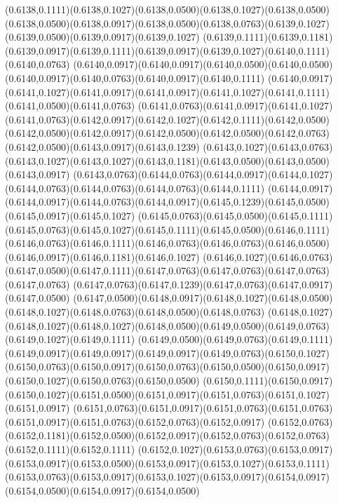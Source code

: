 (0.6138,0.1111)(0.6138,0.1027)(0.6138,0.0500)(0.6138,0.1027)(0.6138,0.0500)
\PST@Solid(0.6138,0.0500)(0.6138,0.0917)(0.6138,0.0500)(0.6138,0.0763)(0.6139,0.1027)(0.6139,0.0500)(0.6139,0.0917)(0.6139,0.1027)
(0.6139,0.1111)(0.6139,0.1181)(0.6139,0.0917)(0.6139,0.1111)(0.6139,0.0917)(0.6139,0.1027)(0.6140,0.1111)(0.6140,0.0763)
(0.6140,0.0917)(0.6140,0.0917)(0.6140,0.0500)(0.6140,0.0500)(0.6140,0.0917)(0.6140,0.0763)(0.6140,0.0917)(0.6140,0.1111)
(0.6140,0.0917)(0.6141,0.1027)(0.6141,0.0917)(0.6141,0.0917)(0.6141,0.1027)(0.6141,0.1111)(0.6141,0.0500)(0.6141,0.0763)
(0.6141,0.0763)(0.6141,0.0917)(0.6141,0.1027)(0.6141,0.0763)(0.6142,0.0917)(0.6142,0.1027)(0.6142,0.1111)(0.6142,0.0500)
(0.6142,0.0500)(0.6142,0.0917)(0.6142,0.0500)(0.6142,0.0500)(0.6142,0.0763)(0.6142,0.0500)(0.6143,0.0917)(0.6143,0.1239)
(0.6143,0.1027)(0.6143,0.0763)(0.6143,0.1027)(0.6143,0.1027)(0.6143,0.1181)(0.6143,0.0500)(0.6143,0.0500)(0.6143,0.0917)
(0.6143,0.0763)(0.6144,0.0763)(0.6144,0.0917)(0.6144,0.1027)(0.6144,0.0763)(0.6144,0.0763)(0.6144,0.0763)(0.6144,0.1111)
(0.6144,0.0917)(0.6144,0.0917)(0.6144,0.0763)(0.6144,0.0917)(0.6145,0.1239)(0.6145,0.0500)(0.6145,0.0917)(0.6145,0.1027)
(0.6145,0.0763)(0.6145,0.0500)(0.6145,0.1111)(0.6145,0.0763)(0.6145,0.1027)(0.6145,0.1111)(0.6145,0.0500)(0.6146,0.1111)
(0.6146,0.0763)(0.6146,0.1111)(0.6146,0.0763)(0.6146,0.0763)(0.6146,0.0500)(0.6146,0.0917)(0.6146,0.1181)(0.6146,0.1027)
(0.6146,0.1027)(0.6146,0.0763)(0.6147,0.0500)(0.6147,0.1111)(0.6147,0.0763)(0.6147,0.0763)(0.6147,0.0763)(0.6147,0.0763)
(0.6147,0.0763)(0.6147,0.1239)(0.6147,0.0763)(0.6147,0.0917)(0.6147,0.0500)
\PST@Solid(0.6147,0.0500)(0.6148,0.0917)(0.6148,0.1027)(0.6148,0.0500)(0.6148,0.1027)(0.6148,0.0763)(0.6148,0.0500)(0.6148,0.0763)
(0.6148,0.1027)(0.6148,0.1027)(0.6148,0.1027)(0.6148,0.0500)(0.6149,0.0500)(0.6149,0.0763)(0.6149,0.1027)(0.6149,0.1111)
(0.6149,0.0500)(0.6149,0.0763)(0.6149,0.1111)(0.6149,0.0917)(0.6149,0.0917)(0.6149,0.0917)(0.6149,0.0763)(0.6150,0.1027)
(0.6150,0.0763)(0.6150,0.0917)(0.6150,0.0763)(0.6150,0.0500)(0.6150,0.0917)(0.6150,0.1027)(0.6150,0.0763)(0.6150,0.0500)
(0.6150,0.1111)(0.6150,0.0917)(0.6150,0.1027)(0.6151,0.0500)(0.6151,0.0917)(0.6151,0.0763)(0.6151,0.1027)(0.6151,0.0917)
(0.6151,0.0763)(0.6151,0.0917)(0.6151,0.0763)(0.6151,0.0763)(0.6151,0.0917)(0.6151,0.0763)(0.6152,0.0763)(0.6152,0.0917)
(0.6152,0.0763)(0.6152,0.1181)(0.6152,0.0500)(0.6152,0.0917)(0.6152,0.0763)(0.6152,0.0763)(0.6152,0.1111)(0.6152,0.1111)
(0.6152,0.1027)(0.6153,0.0763)(0.6153,0.0917)(0.6153,0.0917)(0.6153,0.0500)(0.6153,0.0917)(0.6153,0.1027)(0.6153,0.1111)
(0.6153,0.0763)(0.6153,0.0917)(0.6153,0.1027)(0.6153,0.0917)(0.6154,0.0917)(0.6154,0.0500)(0.6154,0.0917)(0.6154,0.0500)
